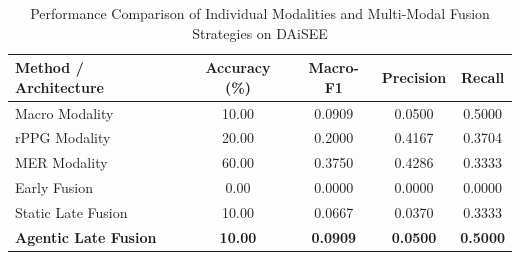 \begin{table}[htbp]
\centering
\caption{Performance Comparison of Individual Modalities and Multi-Modal Fusion Strategies on DAiSEE}
\label{tab:engagement_results}
\begin{tabular}{lcccc}
\hline
\textbf{Method / Architecture} & \textbf{Accuracy (\%)} & \textbf{Macro-F1} & \textbf{Precision} & \textbf{Recall} \\
\hline
Macro Modality & 10.00 & 0.0909 & 0.0500 & 0.5000 \\
rPPG Modality & 20.00 & 0.2000 & 0.4167 & 0.3704 \\
MER Modality & 60.00 & 0.3750 & 0.4286 & 0.3333 \\
Early Fusion & 0.00 & 0.0000 & 0.0000 & 0.0000 \\
Static Late Fusion & 10.00 & 0.0667 & 0.0370 & 0.3333 \\
\textbf{Agentic Late Fusion} & \textbf{10.00} & \textbf{0.0909} & \textbf{0.0500} & \textbf{0.5000} \\
\hline
\end{tabular}
\end{table}
